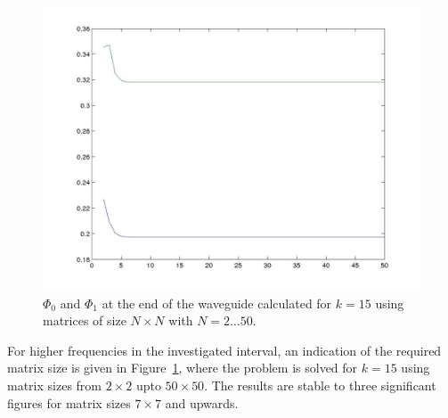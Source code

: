 \documentclass[numreferences]{kluwer}
\renewcommand{\Phi}{\varPhi}
\renewcommand{\Re}{\operatorname{Re}}
\renewcommand{\Phi}{\varPhi}
\begin{document}
\begin{figure}[htb]
  \centering
  \includegraphics[scale=0.45]{T_N}
  \caption{$\Phi_0$ and $\Phi_1$ at the end of the waveguide
    calculated for $k=15$ using matrices of size $N\times N$ with
    $N=2\dots50$.}
  \label{fig:T_N}
\end{figure}

For higher frequencies in the investigated interval, an indication of
the required matrix size is given in Figure~\ref{fig:T_N}, where the
problem is solved for $k=15$ using matrix sizes from $2\times2$ upto
$50\times50$. The results are stable to three significant figures for
matrix sizes $7\times7$ and upwards.

 




\end{document}
